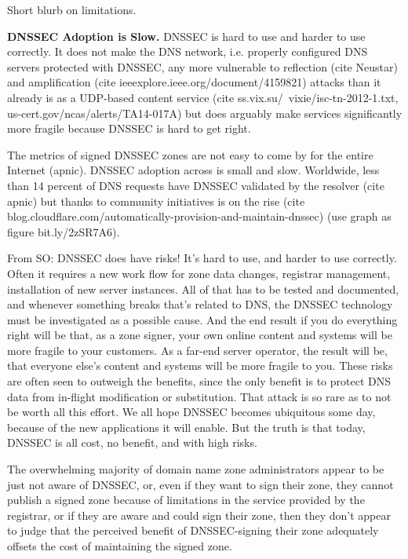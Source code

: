 Short blurb on limitations.

\textbf{DNSSEC Adoption is Slow.}    DNSSEC is hard to use and harder to use
correctly. It does not make the DNS network, i.e. properly configured DNS
servers protected with DNSSEC, any more vulnerable to reflection (cite Neustar)
and amplification (cite ieeexplore.ieee.org/document/4159821) attacks than it
already is as a UDP-based content service (cite
ss.vix.su/~vixie/isc-tn-2012-1.txt, us-cert.gov/ncas/alerts/TA14-017A) but does
arguably make services significantly more fragile because DNSSEC is hard to get
right.

The metrics of signed DNSSEC zones are not easy to come by for the entire
Internet (apnic). DNSSEC adoption across is small and slow. Worldwide, less than
14 percent of DNS requests have DNSSEC validated by the resolver (cite apnic)
but thanks to community initiatives is on the rise (cite
blog.cloudflare.com/automatically-provision-and-maintain-dnssec) (use graph as
figure bit.ly/2zSR7A6).

From SO: DNSSEC does have risks! It's hard to use, and harder to use correctly.
Often it requires a new work flow for zone data changes, registrar management,
installation of new server instances. All of that has to be tested and
documented, and whenever something breaks that's related to DNS, the DNSSEC
technology must be investigated as a possible cause. And the end result if you
do everything right will be that, as a zone signer, your own online content and
systems will be more fragile to your customers. As a far-end server operator,
the result will be, that everyone else's content and systems will be more
fragile to you. These risks are often seen to outweigh the benefits, since the
only benefit is to protect DNS data from in-flight modification or substitution.
That attack is so rare as to not be worth all this effort. We all hope DNSSEC
becomes ubiquitous some day, because of the new applications it will enable. But
the truth is that today, DNSSEC is all cost, no benefit, and with high risks.

The overwhelming majority of domain name zone administrators appear to be just
not aware of DNSSEC, or, even if they want to sign their zone, they cannot
publish a signed zone because of limitations in the service provided by the
registrar, or if they are aware and could sign their zone, then they don’t
appear to judge that the perceived benefit of DNSSEC-signing their zone
adequately offsets the cost of maintaining the signed zone.


